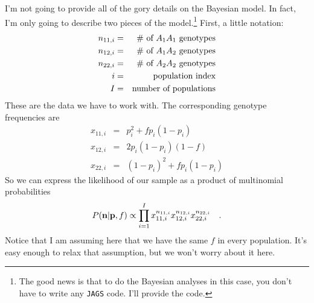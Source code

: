 I'm not going to provide all of the gory details on the Bayesian
model. In fact, I'm only going to describe two pieces of the
model.\footnote{The good news is that to do the Bayesian analyses in
  this case, you don't have to write any {\tt JAGS} code. I'll provide
  the code.} First, a little notation:
\begin{eqnarray*}
n_{11,i} &=& \hbox{\# of $A_1A_1$ genotypes} \\
n_{12,i} &=& \hbox{\# of $A_1A_2$ genotypes} \\
n_{22,i} &=& \hbox{\# of $A_2A_2$ genotypes} \\
i         &=& \hbox{population index} \\
I         &=& \hbox{number of populations} \\
\end{eqnarray*}
These are the data we have to work with. The corresponding genotype
frequencies are
\begin{eqnarray*}
x_{11,i} &=& p_{i}^2 + fp_{i}(1-p_{i}) \\
x_{12,i} &=& 2p_{i}(1-p_{i})(1-f) \\
x_{22,i} &=& (1-p_{i})^2 + fp_{i}(1-p_{i})
\end{eqnarray*}
So we can express the likelihood of our sample as a product of
multinomial probabilities
\[
P({\bf n}|{\bf p},f) \propto \prod_{i=1}^I x_{11,i}^{n_{11,i}}
x_{12,i}^{n_{12,i}} x_{22,i}^{n_{22,i}} \quad .
\]
Notice that I am assuming here that we have the same $f$ in every
population. It's easy enough to relax that assumption, but we won't
worry about it here.

